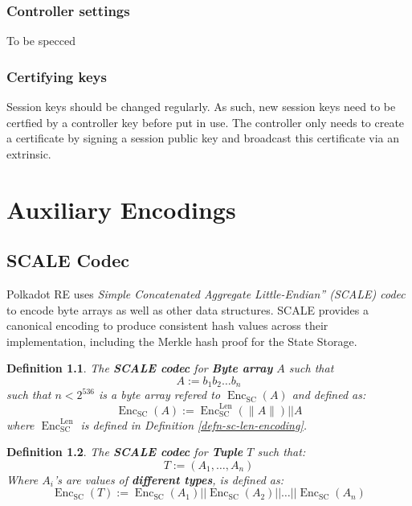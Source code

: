 \documentclass{book}
\newcommand{\assign}{:=}
\newcommand{\tmem}[1]{{\em #1\/}}
\newcommand{\tmop}[1]{\ensuremath{\operatorname{#1}}}
\newcommand{\tmstrong}[1]{\textbf{#1}}
\newcommand{\tmtextbf}[1]{{\bfseries{#1}}}
\newcommand{\tmtextit}[1]{{\itshape{#1}}}
\newtheorem{definition}{Definition}
\providecommand{\tmem}[1]{\tmtextit{#1}}
\providecommand{\tmop}[1]{\ensuremath{\mathrm{#1}}}
\providecommand{\tmstrong}[1]{\tmtextbf{#1}}
\providecommand{\tmtextbf}[1]{\tmtextbf{#1}}
\providecommand{\tmtextit}[1]{\tmtextit{#1}}
\newtheorem{definition}{Definition}
\begin{document}
\subsection{Controller settings}

\label{desc-controller-settings}To be specced

\subsection{Certifying keys}

\label{desc-certifying-keys}Session keys should be changed regularly. As such,
new session keys need to be certfied by a controller key before put in use.
The controller only needs to create a certificate by signing a session public
key and broadcast this certificate via an extrinsic. {}\chapter{Auxiliary
Encodings}\label{sect-encoding}

\section{SCALE Codec}\label{sect-scale-codec}

Polkadot RE uses {\tmem{Simple Concatenated Aggregate Little-Endian'' (SCALE)
codec}} to encode byte arrays as well as other data structures. SCALE provides
a canonical encoding to produce consistent hash values across their
implementation, including the Merkle hash proof for the State Storage.

\begin{definition}
  \label{defn-scale-byte-array}The {\tmstrong{SCALE codec}} for
  {\tmstrong{Byte array}} $A$ such that
  \[ A \assign b_1 b_2 \ldots b_n \]
  such that $n < 2^{536}$ is a byte array refered to $\tmop{Enc}_{\tmop{SC}}
  (A)$ and defined as:
  \[ \tmop{Enc}_{\tmop{SC}} (A) \assign \tmop{Enc}^{\tmop{Len}}_{\tmop{SC}}
     (\| A \|) | | A \]
  where $\tmop{Enc}_{\tmop{SC}}^{\tmop{Len}}$ is defined in Definition
  \ref{defn-sc-len-encoding}. 
\end{definition}

\begin{definition}
  \label{defn-scale-tuple}The {\tmstrong{SCALE codec}} for {\tmstrong{Tuple}}
  $T$ such that:
  \[ T \assign (A_1, \ldots, A_n) \]
  Where $A_i$'s are values of {\tmstrong{different types}}, is defined as:
  \[ \tmop{Enc}_{\tmop{SC}} (T) \assign \tmop{Enc}_{\tmop{SC}} (A_1) | |
     \tmop{Enc}_{\tmop{SC}} (A_2) | | \ldots | | \tmop{Enc}_{\tmop{SC}} (A_n)
  \]
\end{definition}
\end{document}
